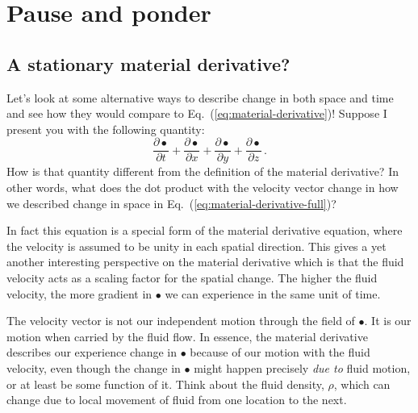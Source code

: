 \section{Pause and ponder}

\subsection{A stationary material derivative?}

Let's look at some alternative ways to describe change in both space and time and see how they would compare to Eq.~(\ref{eq:material-derivative})! Suppose I present you with the following quantity:
\begin{equation} \label{eq:all-derivatives}
\frac{\partial \bullet}{\partial t} + \frac{\partial \bullet}{\partial x} + \frac{\partial \bullet}{\partial y} + \frac{\partial \bullet}{\partial z} \, .
\end{equation}
How is that quantity different from the definition of the material derivative? In other words, what does the dot product with the velocity vector change in how we described change in space in Eq.~(\ref{eq:material-derivative-full})?

In fact this equation is a special form of the material derivative equation, where the velocity is assumed to be unity in each spatial direction. This gives a yet another interesting perspective on the material derivative which is that the fluid velocity acts as a scaling factor for the spatial change. The higher the fluid velocity, the more gradient in $\bullet$ we can experience in the same unit of time.





The velocity vector is not our independent motion through the field of $\bullet$. It is our motion when carried by the fluid flow. In essence, the material derivative describes our experience change in $\bullet$ because of our motion with the fluid velocity, even though the change in $\bullet$ might happen precisely \textit{due to} fluid motion, or at least be some function of it. Think about the fluid density, $\rho$, which can change due to local movement of fluid from one location to the next.





